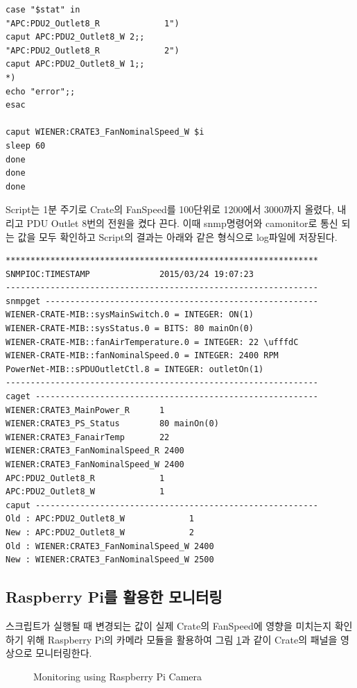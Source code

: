 \documentclass[11pt
  , a4paper
  , article
  , oneside
]{memoir}
\begin{document}
\begin{lstlisting}[style=termstyle]
case "$stat" in
"APC:PDU2_Outlet8_R             1")
caput APC:PDU2_Outlet8_W 2;;
"APC:PDU2_Outlet8_R             2")
caput APC:PDU2_Outlet8_W 1;;
*)
echo "error";;
esac

caput WIENER:CRATE3_FanNominalSpeed_W $i
sleep 60
done
done
done
\end{lstlisting}

Script는 1분 주기로 Crate의 FanSpeed를 100단위로 1200에서 3000까지 올렸다, 내리고 PDU Outlet 8번의 전원을 켰다 끈다. 이때 snmp명령어와 camonitor로 통신 되는 값을 모두 확인하고 Script의 결과는 아래와 같은 형식으로 log파일에 저장된다.

\begin{lstlisting}[style=termstyle]
***************************************************************
SNMPIOC:TIMESTAMP              2015/03/24 19:07:23
---------------------------------------------------------------
snmpget -------------------------------------------------------
WIENER-CRATE-MIB::sysMainSwitch.0 = INTEGER: ON(1)
WIENER-CRATE-MIB::sysStatus.0 = BITS: 80 mainOn(0) 
WIENER-CRATE-MIB::fanAirTemperature.0 = INTEGER: 22 \ufffdC
WIENER-CRATE-MIB::fanNominalSpeed.0 = INTEGER: 2400 RPM
PowerNet-MIB::sPDUOutletCtl.8 = INTEGER: outletOn(1)
---------------------------------------------------------------
caget ---------------------------------------------------------
WIENER:CRATE3_MainPower_R      1
WIENER:CRATE3_PS_Status        80 mainOn(0)
WIENER:CRATE3_FanairTemp       22
WIENER:CRATE3_FanNominalSpeed_R 2400
WIENER:CRATE3_FanNominalSpeed_W 2400
APC:PDU2_Outlet8_R             1
APC:PDU2_Outlet8_W             1
caput ---------------------------------------------------------
Old : APC:PDU2_Outlet8_W             1
New : APC:PDU2_Outlet8_W             2
Old : WIENER:CRATE3_FanNominalSpeed_W 2400
New : WIENER:CRATE3_FanNominalSpeed_W 2500
\end{lstlisting}

\subsection{Raspberry Pi를 활용한 모니터링}
스크립트가 실행될 때 변경되는 값이 실제 Crate의 FanSpeed에 영향을 미치는지 확인하기 위해 Raspberry Pi의 카메라 모듈을 활용하여 그림 \ref{fig:rpimonitoring}과 같이 Crate의 패널을 영상으로 모니터링한다.

\begin{figure}[!h]
  \centering
              \hfill
              \hfill
  \caption
      {
Monitoring using Raspberry Pi Camera
      }
 \label{fig:rpimonitoring}
\end{figure}
\end{document}
